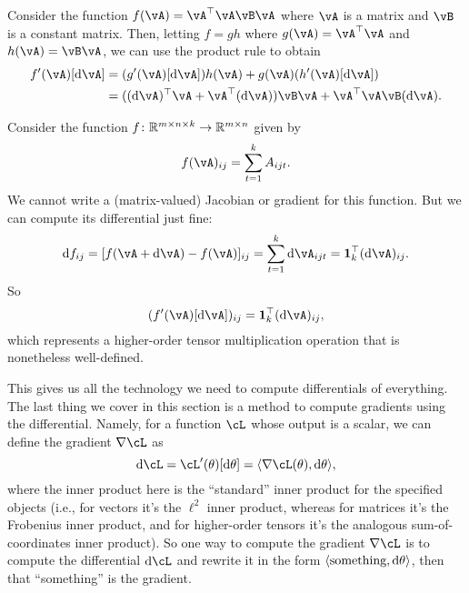 \documentclass[../../book-main.tex]{subfiles}
\begin{document}
\begin{example}
    Consider the function \(f(\vA) = \vA^{\top}\vA\vB\vA\) where \(\vA\) is a matrix and \(\vB\) is a constant matrix. Then, letting \(f = gh\) where \(g(\vA) = \vA^{\top}\vA\) and \(h(\vA) = \vB\vA\), we can use the product rule to obtain 
    \begin{align}
        f^{\prime}(\vA)[\odif{\vA}]
        &= (g^{\prime}(\vA)[\odif{\vA}])h(\vA) + g(\vA)(h^{\prime}(\vA)[\odif{\vA}]) \\
        &= ((\odif{\vA})^{\top}\vA + \vA^{\top}(\odif{\vA}))\vB\vA + \vA^{\top}\vA\vB(\odif{\vA}).
    \end{align}
\end{example}

\begin{example}
    Consider the function \(f \colon \mathbb{R}^{m \times n \times k} \to \mathbb{R}^{m \times n}\) given by 
    \begin{equation}
        f(\vA)_{ij} = \sum_{t = 1}^{k}A_{ijt}.
    \end{equation}
    We cannot write a (matrix-valued) Jacobian or gradient for this function. But we can compute its differential just fine:
    \begin{equation}
        \odif{f}_{ij} = [f(\vA + \odif{\vA}) - f(\vA)]_{ij} = \sum_{t = 1}^{k}\odif{\vA}_{ijt} = \vone_{k}^{\top}(\odif{\vA})_{ij}.
    \end{equation}
    So 
    \begin{equation}
        (f^{\prime}(\vA)[\odif{\vA}])_{ij} = \vone_{k}^{\top}(\odif{\vA})_{ij},
    \end{equation}
    which represents a higher-order tensor multiplication operation that is nonetheless well-defined.
\end{example}

This gives us all the technology we need to compute differentials of everything. The last thing we cover in this section is a method to compute gradients using the differential. Namely, for a function \(\cL\) whose output is a scalar, we can define the gradient \(\nabla \cL\) as 
\begin{equation}
    \odif{\cL} = \cL^{\prime}(\theta)[\odif{\theta}] = \ip{\nabla \cL(\theta)}{\odif{\theta}},
\end{equation}
where the inner product here is the ``standard'' inner product for the specified objects (i.e., for vectors it's the \(\ell^{2}\) inner product, whereas for matrices it's the Frobenius inner product, and for higher-order tensors it's the analogous sum-of-coordinates inner product). So one way to compute the gradient \(\nabla \cL\) is to compute the differential \(\odif{\cL}\) and rewrite it in the form \(\ip{\text{something}}{\odif{\theta}}\), then that ``something'' is the gradient.
\end{document}
